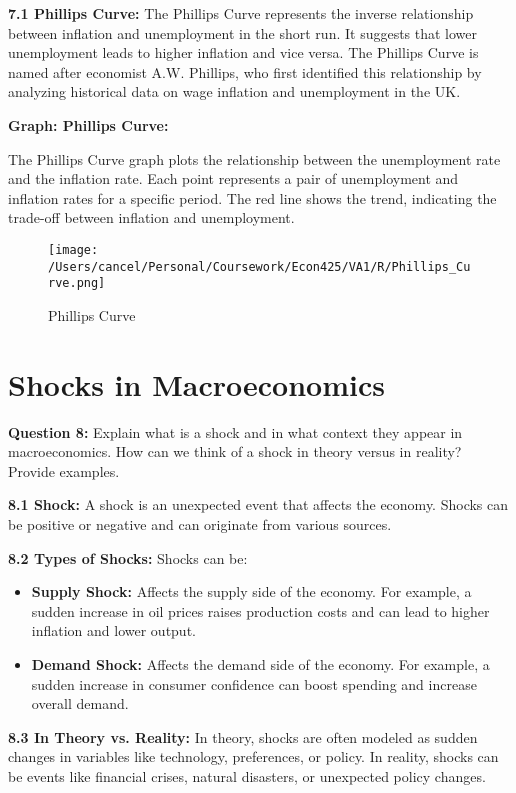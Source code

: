 \documentclass{article}
\begin{document}
\textbf{7.1 Phillips Curve:} The Phillips Curve represents the inverse relationship between inflation and unemployment in the short run. It suggests that lower unemployment leads to higher inflation and vice versa. The Phillips Curve is named after economist A.W. Phillips, who first identified this relationship by analyzing historical data on wage inflation and unemployment in the UK.

\textbf{Graph: Phillips Curve:} 

The Phillips Curve graph plots the relationship between the unemployment rate and the inflation rate. Each point represents a pair of unemployment and inflation rates for a specific period. The red line shows the trend, indicating the trade-off between inflation and unemployment.

\begin{figure}[h!]
    \centering
    \texttt{[image: /Users/cancel/Personal/Coursework/Econ425/VA1/R/Phillips\_Curve.png]}
    \caption{Phillips Curve}
\end{figure}

\hrulefill

\section{Shocks in Macroeconomics}

\textbf{Question 8:} Explain what is a shock and in what context they appear in macroeconomics. How can we think of a shock in theory versus in reality? Provide examples.

\textbf{8.1 Shock:} A shock is an unexpected event that affects the economy. Shocks can be positive or negative and can originate from various sources.

\textbf{8.2 Types of Shocks:} Shocks can be:

\begin{itemize}
    \item \textbf{Supply Shock:} Affects the supply side of the economy. For example, a sudden increase in oil prices raises production costs and can lead to higher inflation and lower output.
    \item \textbf{Demand Shock:} Affects the demand side of the economy. For example, a sudden increase in consumer confidence can boost spending and increase overall demand.
\end{itemize}

\textbf{8.3 In Theory vs. Reality:} In theory, shocks are often modeled as sudden changes in variables like technology, preferences, or policy. In reality, shocks can be events like financial crises, natural disasters, or unexpected policy changes.
\end{document}
